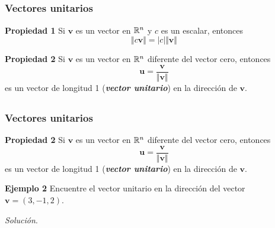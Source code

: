 
\subsection{}

\begin{frame}\frametitle{Vectores unitarios}
	
	\begin{prop}{\textbf{Propiedad 1}}
		\justifying
		Si $\mathbf{v}$ es un vector en $\mathbb{R}^n$ y $c$ es un escalar, entonces
		\[
		\Vert c\mathbf{v}\Vert = |c| \Vert \mathbf{v}\Vert
		\]
	\end{prop}	
	
	\begin{prop}{\textbf{Propiedad 2}}
		\justifying
		Si $\mathbf{v}$ es un vector en $\mathbb{R}^n$ diferente del vector cero, entonces
		\[
		\mathbf{u} = \frac{\mathbf{v}}{\Vert \mathbf{v}\Vert} 
		\]
		es un vector de longitud 1 (\textbf{\textit{vector unitario}}) en la dirección de $\mathbf{v}$.
	\end{prop}	
	
	
\end{frame}


\subsection{}

\begin{frame}\frametitle{Vectores unitarios}


\begin{prop}{\textbf{Propiedad 2}}
	\justifying
	Si $\mathbf{v}$ es un vector en $\mathbb{R}^n$ diferente del vector cero, entonces
	\[
		\mathbf{u} = \frac{\mathbf{v}}{\Vert \mathbf{v}\Vert} 
	\]
	es un vector de longitud 1 (\textbf{\textit{vector unitario}}) en la dirección de $\mathbf{v}$.
\end{prop}	

\begin{ej}{\textbf{Ejemplo 2}}
	Encuentre el vector unitario en la dirección del vector $\mathbf{v}=(3,-1,2)$.
\end{ej}
\textit{Solución}.

\end{frame}

